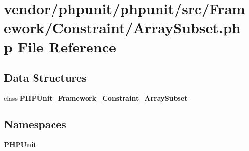 \section{vendor/phpunit/phpunit/src/\+Framework/\+Constraint/\+Array\+Subset.php File Reference}
\label{_array_subset_8php}
\subsection*{Data Structures}
\begin{DoxyCompactItemize}
\item 
class {\bf P\+H\+P\+Unit\+\_\+\+Framework\+\_\+\+Constraint\+\_\+\+Array\+Subset}
\end{DoxyCompactItemize}
\subsection*{Namespaces}
\begin{DoxyCompactItemize}
\item 
 {\bf P\+H\+P\+Unit}
\end{DoxyCompactItemize}
